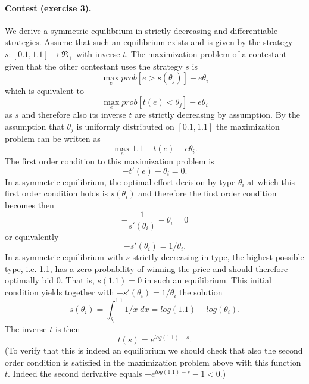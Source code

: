 \documentclass[a4paper,11pt]{article}
\begin{document}
\paragraph{Contest (exercise 3).} We derive a symmetric equilibrium in strictly decreasing and differentiable strategies. Assume that such an equilibrium exists and is given by the strategy $s:[0.1,1.1]\rightarrow \Re_+$ with inverse $t$. The maximization problem of a contestant given that the other contestant uses the strategy $s$ is
\begin{equation*}
  \max_e prob[e>s(\theta _j)]-e\theta _i
\end{equation*}
which is equivalent to 
\begin{equation*}
  \max_e prob[t(e)<\theta _j]-e\theta _i
\end{equation*}
as $s$ and therefore also its inverse $t$ are strictly decreasing by assumption. By the assumption that $\theta _j$ is uniformly distributed on $[0.1,1.1]$ the maximization problem can be written as
\begin{equation*}
  \max_e 1.1-t(e)-e\theta _i.
\end{equation*}
The first order condition to this maximization problem is
\begin{equation*}
  -t'(e)-\theta _i=0.
\end{equation*}
In a symmetric equilibrium, the optimal effort decision by type $\theta _i$ at which this first order condition holds is $s(\theta _i)$ and therefore the first order condition becomes then
\begin{equation*}
  -\frac{1}{s'(\theta _i)}-\theta _i=0
\end{equation*}
or equivalently
\begin{equation*}
  -s'(\theta _i)=1/\theta _i.
\end{equation*}
In a symmetric equilibrium with $s$ strictly decreasing in type, the highest possible type, i.e. 1.1, has a zero probability of winning the price and should therefore optimally bid 0. That is, $s(1.1)=0$ in such an equilibrium. This initial condition yields together with $-s'(\theta _i)=1/\theta _i$ the solution
\begin{equation*}
  s(\theta _i)=\int_{\theta _i}^{1.1}1/x \;dx=log(1.1)-log(\theta _i).
\end{equation*}
The inverse $t$ is then
\begin{equation*}
t(s)=e^{log(1.1)-s}.
\end{equation*}
(To verify that this is indeed an equilibrium we should check that also the second order condition is satisfied in the maximization problem above with this function $t$. Indeed the second derivative equals $-e^{log(1.1)-s}-1<0$.)
\end{document}
